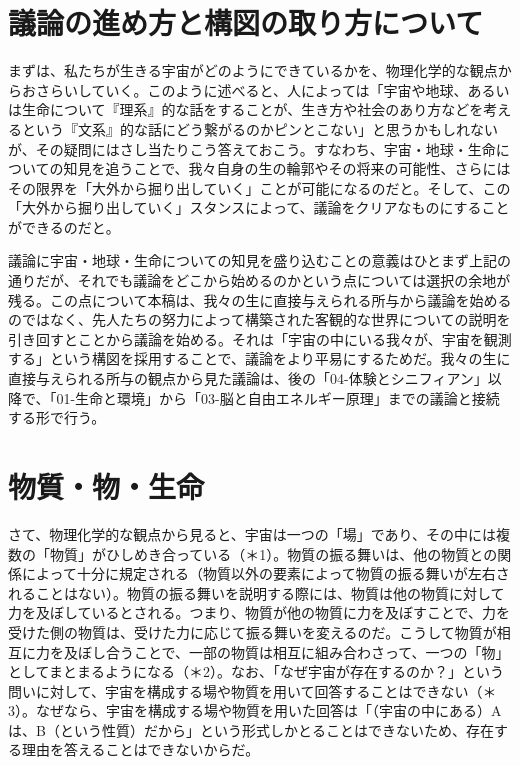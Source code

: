 \documentclass[
]{ltjsarticle}
\author{}
\date{}
\begin{document}
\section{議論の進め方と構図の取り方について}\label{ux8b70ux8ad6ux306eux9032ux3081ux65b9ux3068ux69cbux56f3ux306eux53d6ux308aux65b9ux306bux3064ux3044ux3066}

まずは、私たちが生きる宇宙がどのようにできているかを、物理化学的な観点からおさらいしていく。このように述べると、人によっては「宇宙や地球、あるいは生命について『理系』的な話をすることが、生き方や社会のあり方などを考えるという『文系』的な話にどう繋がるのかピンとこない」と思うかもしれないが、その疑問にはさし当たりこう答えておこう。すなわち、宇宙・地球・生命についての知見を追うことで、我々自身の生の輪郭やその将来の可能性、さらにはその限界を「大外から掘り出していく」ことが可能になるのだと。そして、この「大外から掘り出していく」スタンスによって、議論をクリアなものにすることができるのだと。

議論に宇宙・地球・生命についての知見を盛り込むことの意義はひとまず上記の通りだが、それでも議論をどこから始めるのかという点については選択の余地が残る。この点について本稿は、我々の生に直接与えられる所与から議論を始めるのではなく、先人たちの努力によって構築された客観的な世界についての説明を引き回すとことから議論を始める。それは「宇宙の中にいる我々が、宇宙を観測する」という構図を採用することで、議論をより平易にするためだ。我々の生に直接与えられる所与の観点から見た議論は、後の「04-体験とシニフィアン」以降で、「01-生命と環境」から「03-脳と自由エネルギー原理」までの議論と接続する形で行う。

\section{物質・物・生命}\label{ux7269ux8ceaux7269ux751fux547d}

さて、物理化学的な観点から見ると、宇宙は一つの「場」であり、その中には複数の「物質」がひしめき合っている（＊1）。物質の振る舞いは、他の物質との関係によって十分に規定される（物質以外の要素によって物質の振る舞いが左右されることはない）。物質の振る舞いを説明する際には、物質は他の物質に対して力を及ぼしているとされる。つまり、物質が他の物質に力を及ぼすことで、力を受けた側の物質は、受けた力に応じて振る舞いを変えるのだ。こうして物質が相互に力を及ぼし合うことで、一部の物質は相互に組み合わさって、一つの「物」としてまとまるようになる（＊2）。なお、「なぜ宇宙が存在するのか？」という問いに対して、宇宙を構成する場や物質を用いて回答することはできない（＊3）。なぜなら、宇宙を構成する場や物質を用いた回答は「（宇宙の中にある）Aは、B（という性質）だから」という形式しかとることはできないため、存在する理由を答えることはできないからだ。
\end{document}
